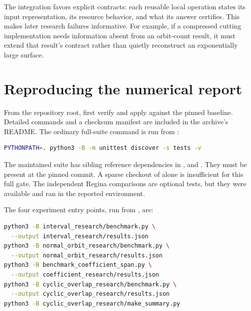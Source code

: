 The integration favors explicit contracts: each reusable local operation
states its input representation, its resource behavior, and what its
answer certifies. This makes later research failures informative. For
example, if a compressed cutting implementation needs information absent
from an orbit-count result, it must extend that result's contract rather
than quietly reconstruct an exponentially large surface.



\appendix
\section{Reproducing the numerical report}

From the repository root, first verify and apply 
against the pinned baseline. Detailed commands and a checksum manifest
are included in the archive's README. The ordinary full-suite command is
run from :

\noindent\begin{minipage}{\linewidth}
\begin{lstlisting}[language=bash]
PYTHONPATH=. python3 -B -m unittest discover -s tests -v
\end{lstlisting}
\end{minipage}

The maintained suite has sibling reference dependencies in
,  and
. They must be present at the pinned
commit. A sparse checkout of  alone is insufficient for this
full gate. The independent Regina comparisons are optional tests, but
they were available and ran in the reported environment.

The four experiment entry points, run from , are:

\noindent\begin{minipage}{\linewidth}
\begin{lstlisting}[language=bash]
python3 -B interval_research/benchmark.py \
  --output interval_research/results.json
python3 -B normal_orbit_research/benchmark.py \
  --output normal_orbit_research/results.json
python3 -B benchmark_coefficient_span.py \
  --output coefficient_research/results.json
python3 -B cyclic_overlap_research/benchmark.py \
  --output cyclic_overlap_research/results.json
python3 -B cyclic_overlap_research/make_summary.py
\end{lstlisting}
\end{minipage}

